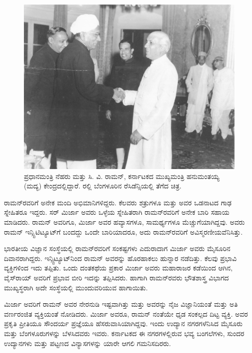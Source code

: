 \begin{figure}[!htpb]
\centering
\includegraphics[scale=0.23]{"images/10.jpg"}
\caption{ಪ್ರಧಾನಮಂತ್ರಿ ನೆಹರು ಮತ್ತು ಸಿ. ವಿ. ರಾಮನ್, ಕರ್ನಾಟಕದ ಮುಖ್ಯಮಂತ್ರಿ ಹನುಮಂತಯ್ಯ (ಮದ್ಯ) ಕೇಂದ್ರದಲ್ಲಿದ್ದಾರೆ. ರಲ್ಲಿ ಬೆಂಗಳೂರಿನ ರೆಸಿಡೆನ್ಸಿಯಲ್ಲಿ ತೆಗೆದ ಚಿತ್ರ.}\label{chap3-fig01}
\end{figure}

\newpage


ರಾಮನ್‍ರವರಿಗೆ ಅನೇಕ ಮಂದಿ ಅಭಿಮಾನಿಗಳಿದ್ದರು. ಕೆಲವರು ಶತ್ರುಗಳೂ ಮತ್ತು ಅವರ ಒಡನಾಟದ ಗಾಢ ಸ್ನೇಹಿತರೂ ಇದ್ದರು. ಸರ್ ಮಿರ್ಜಾ ಅವರು ಒಳ್ಳೆಯ ಸ್ನೇಹಿತರಾಗಿ ರಾಮನ್‍ರವರಿಗೆ ಅನೇಕ ಬಾರಿ ಸಹಾಯ ಮಾಡಿದರು. ರಾಮನ್ ಅವರಿಗೂ, ಮಿರ್ಜಾ ಅವರ ಹವ್ಯಾಸಗಳೂ, ಸಾಮರ್ಥ್ಯಗಳೂ ಮೆಚ್ಚುಗೆಯಾಗಿದ್ದವು. ಅವರು ರಾಮನ್ ಇನ್ಸ್ಟಿಟಿಟ್ಯೂಟ್‍ಗೆ ಬಂದದ್ದು ಒಂದೇ ಬಾರಿಯಾದರೂ, ಅದು ರಾಮನ್‍ರವರಿಗೆ ಅವಿಸ್ಮರಣೀಯವೆನಿಸಿತ್ತು.

ಭಾರತೀಯ ವಿಜ್ಞಾನ ಸಂಸ್ಥೆಯಲ್ಲಿ ರಾಮನ್‍ರವರಿಗೆ ಸಂಕಷ್ಟಗಳು ಎದುರಾದಾಗ ಮಿರ್ಜಾ ಅವರು ಮೈಸೂರಿನ ದಿವಾನರಾಗಿದ್ದರು. ಇನ್ಸ್ಟಿಟ್ಯೂಟ್‍ನಿಂದ ರಾಮನ್ ಅವರನ್ನು ಹೊರಹಾಕಲು ಹುನ್ನಾರ ನಡೆದಿತ್ತು. ಕೆಲವು ಪ್ರಭಾವಿ ವ್ಯಕ್ತಿಗಳಿಂದ ಇದು ತಪ್ಪಿತು. ಒಂದು ದಂತಕಥೆಯ ಪ್ರಕಾರ ಮಿರ್ಜಾ ಅವರು ಮಹಾರಾಜರ ಕಡೆಯಿಂದ ಆಗಿನ, ವೈಸ್‍ರಾಯ್ ಅವರಿಗೆ ಪ್ರಭಾವ ಬೀರಿ ಇದನ್ನು ತಪ್ಪಿಸಿದರು. ಹಾಗಾಗಿ ರಾಮನ್‍ರವರು ಭೌತಶಾಸ್ತ್ರ ವಿಭಾಗದ ಮುಖ್ಯಸ್ಥರಾಗಿ ಅದೇ ಸಂಸ್ಥೆಯಲ್ಲಿ ಮುಂದುವರಿಯುವ ಹಾಗಾಯಿತು.

ಮಿರ್ಜಾ ಅವರಿಗೆ ರಾಮನ್ ಅವರ ನೇರನುಡಿ ಇಷ್ಟವಾಗಿತ್ತು ಮತ್ತು ಅವರನ್ನು ನೈಜ ವಿಜ್ಞಾನಿಯಂತೆ ಮತ್ತು ಅತಿ ವರ್ಣರಂಜಿತ ವ್ಯಕ್ತಿಯಂತೆ ನೋಡಿದರು. ಮಿರ್ಜಾ ಅವರೂ, ರಾಮನ್ ನಂತೆಯೇ ಧೃಡ ಸಂಕಲ್ಪದ ದಿಟ್ಟ ವ್ಯಕ್ತಿ. ಅವರ ಪ್ರಕೃತಿ ಪ್ರೀತಿಯೂ ಸೌಂದರ್ಯ ಪ್ರಜ್ಞೆಯೂ ಹೆಸರುವಾಸಿಯಾಗಿದ್ದವು. ಇಂದು ಉದ್ಯಾನ ನಗರಗಳೆನಿಸಿದ ಮೈಸೂರು ಮತ್ತು ಬೆಂಗಳೂರುಗಳನ್ನು ಬೆಳಸಿದವರು ಇವರು. ಕರ್ನಾಟಕದ ಈ ನಗರಗಳಲ್ಲಿರುವ ಭವ್ಯ ಬಂಗಲೆಗಳು, ಸುಂದರ ಉದ್ಯಾನಗಳು ಮತ್ತು ಪಟ್ಟಣದ ವಿನ್ಯಾಸಗಳನ್ನು ಯಾರೇ ಆಗಲಿ ಗಮನಿಸದಿರರು.


